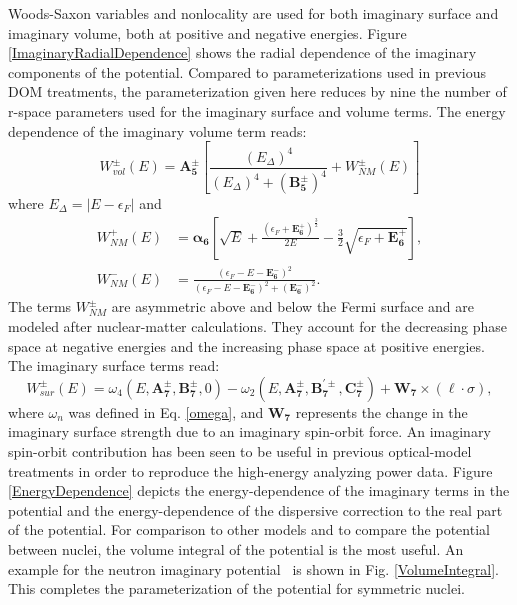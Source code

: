 Woods-Saxon variables and nonlocality are used for both imaginary surface and imaginary volume,
both at positive and
negative energies. Figure \ref{ImaginaryRadialDependence} shows the radial
dependence of the imaginary components of the potential.
Compared to parameterizations used in previous DOM treatments,
the parameterization given here reduces by nine the number of r-space
parameters used for the imaginary surface and volume terms.
The energy dependence of the imaginary volume term reads:
\begin{equation} \label{ImagVolume}
    W_{vol}^{\pm}(E) = \bm{A_{5}^{\pm}}\left[\frac{(E_{\Delta})^{4}}
    {(E_{\Delta})^{4}+(\bm{B_{5}^{\pm}})^{4}} + W_{NM}^{\pm}(E)\right]
\end{equation}
where $E_{\Delta} = |E-\epsilon_{F}|$ and
\begin{equation}
    \begin{split}
        W_{NM}^{+}(E) & = {\bm{\alpha_{6}}}\left[\sqrt{E} +
            \frac{(\epsilon_{F}+\bm{E^{+}_{6}})^{\frac{3}{2}}}{2E}
        -\frac{3}{2}\sqrt{\epsilon_{F}+\bm{E^{+}_{6}}}\right],\\
        W_{NM}^{-}(E) & = \frac{(\epsilon_{F}-E-\bm{E_{6}^{-}})^{2}}
        {(\epsilon_{F}-E-\bm{E_{6}^{-}})^{2}+(\bm{E_{6}^{-}})^{2}}.
        \end{split}
    \end{equation}
The terms $W_{NM}^{\pm}$ are asymmetric above and below the Fermi surface and are modeled after
nuclear-matter calculations. They account for the decreasing phase space at negative energies
and the increasing phase space at positive energies. The imaginary surface terms read:
\begin{equation} \label{ImagSurface}
    W_{sur}^{\pm}(E) = \omega_{4}(E, \bm{A_{7}^{\pm}}, \bm{B_{7}^{\pm}}, 0)
    - \omega_{2}(E, \bm{A_{7}^{\pm}}, \bm{B_{7}^{'\pm}}, \bm{C_{7}^{\pm}}) + 
    \bm{W_{7}}\times(\ell\cdot\sigma),
\end{equation}
where $\omega_{n}$ was defined in Eq. \ref{omega}, and $\bm{W_{7}}$ represents the change in the
imaginary surface strength due to an imaginary spin-orbit force. An imaginary spin-orbit
contribution has been seen to be useful in previous optical-model treatments in order to reproduce 
the high-energy analyzing power data. Figure \ref{EnergyDependence} depicts the
energy-dependence of the imaginary terms in the potential and the
energy-dependence of the dispersive correction to the real part of the
potential. For comparison to other models and to compare the potential between
nuclei, the volume integral of the potential is the most useful. An example 
for the neutron imaginary potential \caForty\ is shown in Fig. \ref{VolumeIntegral}.
This completes the parameterization of the potential for symmetric nuclei.


